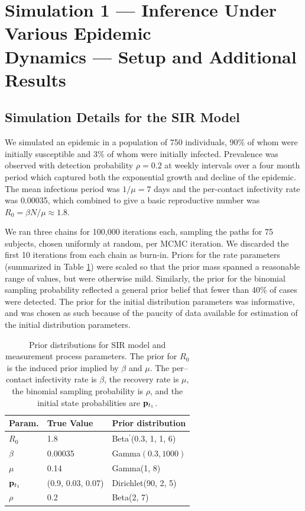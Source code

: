 \section{Simulation 1 --- Inference Under Various Epidemic\\ Dynamics --- Setup and Additional Results}
\label{sec:bda_sim1_details}
\subsection{Simulation Details for the SIR Model}
We simulated an epidemic in a population of 750 individuals, 90\% of whom were initially susceptible and 3\% of whom were initially infected. Prevalence was observed with detection probability $ \rho=0.2 $ at weekly intervals over a four month period which captured both the exponential growth and decline of the epidemic. The mean infectious period was $ 1/\mu = 7 $ days and the per-contact infectivity rate was 0.00035, which combined to give a basic reproductive number was $ R_0 = \beta N /\mu \approx 1.8$.

We ran three chains for 100,000 iterations each, sampling the paths for 75 subjects, chosen uniformly at random, per MCMC iteration. We discarded the first 10 iterations from each chain as burn-in. Priors for the rate parameters (summarized in Table \ref{tab:sim1_sir_priors}) were scaled so that the prior mass spanned a reasonable range of values, but were otherwise mild. Similarly, the prior for the binomial sampling probability reflected a general prior belief that fewer than 40\% of cases were detected. The prior for the initial distribution parameters was informative, and was chosen as such because of the paucity of data available for estimation of the initial distribution parameters.

\begin{table}[htbp]
	\centering
	\begin{tabular}{lll}
		\hline
		Param. & True Value & Prior distribution \\ 
		\hline
		$ R_0 $ & 1.8 & Beta$ ^\prime $(0.3, 1, 1, 6) \\
		$ \beta $ & 0.00035 & Gamma$ (0.3, 1000) $ \\ 
		$ \mu $ & 0.14 & Gamma(1, 8)  \\ 
		$ \mathbf{p}_{t_1} $ & (0.9, 0.03, 0.07) & Dirichlet(90, 2, 5)  \\ 
		$ \rho $ & 0.2 & Beta(2, 7) \\
		\hline
	\end{tabular}
	\caption[Simulation 1 priors for SIR model parameters.]{Prior distributions for SIR model and measurement process parameters. The prior for $ R_0 $ is the induced prior implied by $ \beta $ and $ \mu $. The per--contact infectivity rate is $ \beta $, the recovery rate is $ \mu $, the binomial sampling probability is $ \rho $, and the initial state probabilities are $ \mathbf{p}_{t_1} $.}
	\label{tab:sim1_sir_priors}
\end{table}

